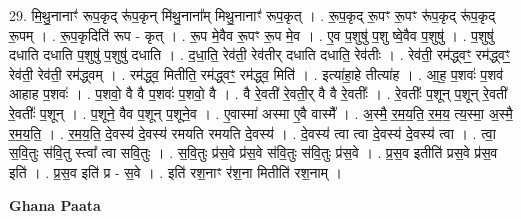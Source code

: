 \documentclass[17pt]{extarticle}
\begin{document}
29. मि॒थु॒नानाꣳ॑ रूप॒कृद् रू॑प॒कृन् मि॑थु॒नाना᳚म् मिथु॒नानाꣳ॑ रूप॒कृत् । . रू॒प॒कृद् रू॒पꣳ रू॒पꣳ रू॑प॒कृद् रू॑प॒कृद् रू॒पम् । . रू॒प॒कृदिति॑ रूप - कृत् । . रू॒प मे॒वैव रू॒पꣳ रू॒प मे॒व । . ए॒व प॒शुषु॑ प॒शु ष्वे॒वैव प॒शुषु॑ । . प॒शुषु॑ दधाति दधाति प॒शुषु॑ प॒शुषु॑ दधाति । . द॒धा॒ति॒ रेव॑ती॒ रेव॑तीर् दधाति दधाति॒ रेव॑तीः । . रेव॑ती॒ रम॑द्ध्वꣳ॒॒ रम॑द्ध्वꣳ॒॒ रेव॑ती॒ रेव॑ती॒ रम॑द्ध्वम् । . रम॑द्ध्व॒ मितीति॒ रम॑द्ध्वꣳ॒॒ रम॑द्ध्व॒ मिति॑ । . इत्या॑हा॒हे तीत्या॑ह । . आ॒ह॒ प॒शवः॑ प॒शव॑ आहाह प॒शवः॑ । . प॒शवो॒ वै वै प॒शवः॑ प॒शवो॒ वै । . वै रे॒वती॑ रे॒वती॒र् वै वै रे॒वतीः᳚ । . रे॒वतीः᳚ प॒शून् प॒शून् रे॒वती॑ रे॒वतीः᳚ प॒शून् । . प॒शूने॒ वैव प॒शून् प॒शूने॒व । . ए॒वास्मा॑ अस्मा ए॒वै वास्मै᳚ । . अ॒स्मै॒ र॒म॒य॒ति॒ र॒म॒य॒ त्य॒स्मा॒ अ॒स्मै॒ र॒म॒य॒ति॒ । . र॒म॒य॒ति॒ दे॒वस्य॑ दे॒वस्य॑ रमयति रमयति दे॒वस्य॑ । . दे॒वस्य॑ त्वा त्वा दे॒वस्य॑ दे॒वस्य॑ त्वा । . त्वा॒ स॒वि॒तुः स॑वि॒तु स्त्वा᳚ त्वा सवि॒तुः । . स॒वि॒तुः प्र॑स॒वे प्र॑स॒वे स॑वि॒तुः स॑वि॒तुः प्र॑स॒वे । . प्र॒स॒व इतीति॑ प्रस॒वे प्र॑स॒व इति॑ । . प्र॒स॒व इति॑ प्र - स॒वे । . इति॑ रश॒नाꣳ र॑श॒ना मितीति॑ रश॒नाम् । \newline

\textbf{Ghana Paata } \newline
\end{document}
